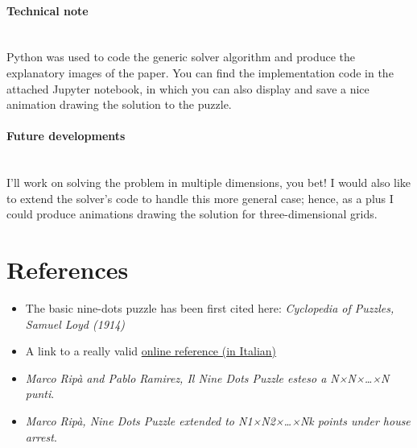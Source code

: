 \documentclass[11pt]{article}
\begin{document}
	\paragraph{Technical note} \mbox{} \\
	Python was used to code the generic solver algorithm and produce the
	explanatory images of the paper. You can find the implementation code in
	the attached Jupyter notebook, in which you can also display and save a
	nice animation drawing the solution to the puzzle.

	\paragraph{Future developments} \mbox{} \\
	I'll work on solving the problem in multiple dimensions, you bet! I
	would also like to extend the solver's code to handle this more general
	case; hence, as a plus I could produce animations drawing the solution
	for three-dimensional grids.

	\hypertarget{references}{
		\section{References}
		\label{references}
	}

	\begin{itemize}
		\item
			The basic nine-dots puzzle has been first cited here: \emph{Cyclopedia of Puzzles, Samuel Loyd (1914)}
		\item
			A link to a really valid \href{http://utenti.quipo.it/base5/geopiana/loyd9punti4linee.htm}{online reference (in Italian)}
		\item
			\emph{Marco Ripà and Pablo Ramirez, Il Nine Dots Puzzle esteso a N×N×\ldots×N punti}.
		\item
			\emph{Marco Ripà, Nine Dots Puzzle extended to N1×N2×\ldots×Nk points 	under house arrest}.
	\end{itemize}
\end{document}
